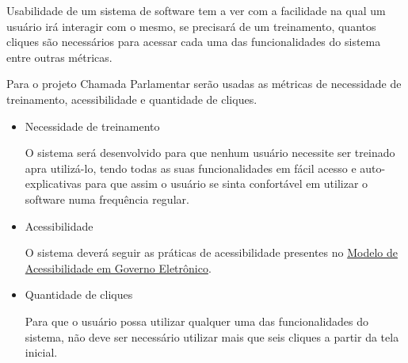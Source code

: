 Usabilidade de um sistema de software tem a ver com a facilidade na qual um usuário irá interagir com o mesmo, se precisará de um treinamento, quantos cliques são necessários para acessar cada uma das funcionalidades do sistema entre outras métricas.

Para o projeto Chamada Parlamentar serão usadas as métricas de necessidade de treinamento, acessibilidade e quantidade de cliques.

\begin{itemize}

	\item{Necessidade de treinamento}

		O sistema será desenvolvido para que nenhum usuário necessite ser treinado apra utilizá-lo, tendo todas as suas funcionalidades em fácil acesso e auto-explicativas para que assim o usuário se sinta confortável em utilizar o software numa frequência regular.

	\item{Acessibilidade}

		O sistema deverá seguir as práticas de acessibilidade presentes no \href{http://www.governoeletronico.gov.br/acoes-e-projetos/e-MAG}{Modelo de Acessibilidade em Governo Eletrônico}\cite{eMAG}.

	\item{Quantidade de cliques}

		Para que o usuário possa utilizar qualquer uma das funcionalidades do sistema, não deve ser necessário utilizar mais que seis cliques a partir da tela inicial.

\end{itemize}